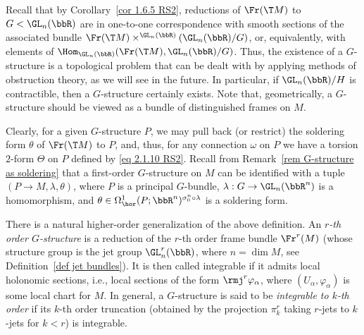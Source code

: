 Recall that by Corollary~\ref{cor 1.6.5 RS2}, reductions of $\Fr(\T M)$ to $G<\GL_n(\bbR)$ are in one-to-one correspondence with smooth sections of the associated bundle $\Fr(\T M)\times^{\GL_n(\bbR)}(\GL_n(\bbR)\slash G)$, or, equivalently, with elements of $\Hom_{\GL_n(\bbR)}(\Fr(\T M),\GL_n(\bbR)\slash G)$. Thus, the existence of a $G$-structure is a topological problem that can be dealt with by applying methods of obstruction theory, as we will see in the future. In particular, if $\GL_n(\bbR)\slash H$ is contractible, then a $G$-structure certainly exists. Note that, geometrically, a $G$-structure should be viewed as a bundle of distinguished frames on $M$.

\begin{rem}
    Clearly, for a given $G$-structure $P$, we may pull back (or restrict) the soldering form $\theta$ of $\Fr(\T M)$ to $P$, and, thus, for any connection $\omega$ on $P$ we have a torsion $2$-form $\Theta$ on $P$ defined by \eqref{eq 2.1.10 RS2}. Recall from Remark~\ref{rem G-structure as soldering} that a first-order $G$-structure on $M$ can be identified with a tuple $(P\to M,\lambda,\theta)$, where $P$ is a principal $G$-bundle, $\lambda:G\to \GL_n(\bbR^n)$ is a homomorphism, and $\theta\in \Omega^1_{\hor}(P;\bbR^n)^{\sigma_0^n\circ\lambda}$ is a soldering form.
\end{rem}

\begin{rem}
    There is a natural higher-order generalization of the above definition. An \emph{$r$-th order $G$-structure} is a reduction of the $r$-th order frame bundle $\Fr^r(M)$ (whose structure group is the jet group $\GL^r_n(\bbR)$, where $n=\dim M$, see Definition~\ref{def jet bundles}). It is then called integrable if it admits local holonomic sections, i.e., local sections of the form $\rmj^r \varphi_\alpha$, where $(U_\alpha,\varphi_\alpha)$ is some local chart for $M$. In general, a $G$-structure is said to be \emph{integrable to $k$-th order} if its $k$-th order truncation (obtained by the projection $\pi^r_k$ taking $r$-jets to $k$-jets for $k<r$) is integrable.
\end{rem}

